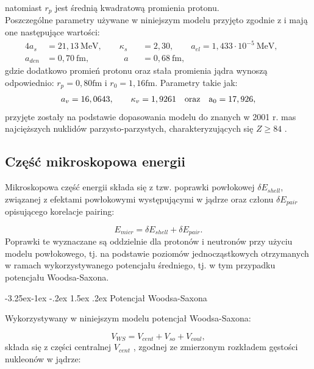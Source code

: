 \documentclass[a4paper,polish,twoside]{article}
\makeatletter
\renewcommand\subsubsection{\@startsection{subsubsection}{3}{\z@}%
	{-3.25ex\@plus -1ex \@minus -.2ex}%
	{1.5ex \@plus .2ex}%
	{\normalfont\normalsize\bfseries\boldmath}}
\numberwithin{equation}{section}
\makeatother
\begin{document}
natomiast $r_{p}$ jest średnią kwadratową promienia protonu. \\
Poszczególne parametry używane w niniejszym modelu przyjęto zgodnie z \cite{Moll1,Moll2} i mają one następujące wartości:
\begin{alignat*}{4}
a_s&=21,13~\mathrm{MeV}, \qquad \kappa_{s}&&=2,30, \qquad a_{el}=1,433 \cdot 10^{-5}~\mathrm{MeV}, &&\\
a_{den}&=0,70~\mathrm{fm}, \qquad \qquad a&&=0,68~\mathrm{fm},
\end{alignat*}
gdzie dodatkowo promień protonu oraz stała promienia jądra wynoszą odpowiednio: $r_p=0,80\mathrm{fm}$ i $r_0=1,16\mathrm{fm}$. Parametry takie jak:
\begin{gather*}
a_v=16,0643, \qquad \kappa_v=1,9261 \quad \rm{oraz} \quad a_0=17,926, 
\end{gather*}
przyjęte zostały na podstawie dopasowania modelu do znanych w 2001 r. mas najcięższych nuklidów parzysto-parzystych, charakteryzujących się $Z \ge 84$ \cite{Muntian}.


\subsection{Część mikroskopowa energii}
Mikroskopowa część energii składa się z tzw. poprawki powłokowej $\delta E_{shell}$, związanej z efektami powłokowymi występującymi w jądrze oraz członu $\delta E_{pair}$ opisującego korelacje pairing:

\begin{equation}
E_{micr}=\delta E_{shell}+\delta E_{pair}.
\end{equation}
Poprawki te wyznaczane są oddzielnie dla protonów i neutronów przy użyciu modelu powłokowego, tj. na podstawie poziomów jednocząstkowych otrzymanych w ramach wykorzystywanego potencjału średniego, tj. w tym przypadku potencjału Woodsa-Saxona.


\subsubsection{Potencjał Woodsa-Saxona}

Wykorzystywany w niniejszym modelu potencjał Woodsa-Saxona:

\begin{equation}\label{V}
V_{WS}=V_{cent}+V_{so}+V_{coul},
\end{equation}
składa się z części centralnej $V_{cent}$ \cite{WS}, zgodnej ze zmierzonym rozkładem gęstości nukleonów w jądrze: 
\end{document}
